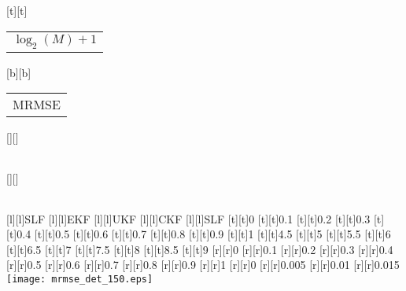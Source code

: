 %    
%
%
\begin{psfrags}%
\psfragscanon%
%
[t][t]{\color[rgb]{0,0,0}\setlength{\tabcolsep}{0pt}\begin{tabular}{c}$\log_2 (M) + 1$\end{tabular}}%
[b][b]{\color[rgb]{0,0,0}\setlength{\tabcolsep}{0pt}\begin{tabular}{c}MRMSE\end{tabular}}%
[][]{\color[rgb]{0,0,0}\setlength{\tabcolsep}{0pt}\begin{tabular}{c} \end{tabular}}%
[][]{\color[rgb]{0,0,0}\setlength{\tabcolsep}{0pt}\begin{tabular}{c} \end{tabular}}%
[l][l]{\color[rgb]{0,0,0}SLF}%
[l][l]{\color[rgb]{0,0,0}EKF}%
[l][l]{\color[rgb]{0,0,0}UKF}%
[l][l]{\color[rgb]{0,0,0}CKF}%
[l][l]{\color[rgb]{0,0,0}SLF}%
%
[t][t]{0}%
[t][t]{0.1}%
[t][t]{0.2}%
[t][t]{0.3}%
[t][t]{0.4}%
[t][t]{0.5}%
[t][t]{0.6}%
[t][t]{0.7}%
[t][t]{0.8}%
[t][t]{0.9}%
[t][t]{1}%
[t][t]{4.5}%
[t][t]{5}%
[t][t]{5.5}%
[t][t]{6}%
[t][t]{6.5}%
[t][t]{7}%
[t][t]{7.5}%
[t][t]{8}%
[t][t]{8.5}%
[t][t]{9}%
%
[r][r]{0}%
[r][r]{0.1}%
[r][r]{0.2}%
[r][r]{0.3}%
[r][r]{0.4}%
[r][r]{0.5}%
[r][r]{0.6}%
[r][r]{0.7}%
[r][r]{0.8}%
[r][r]{0.9}%
[r][r]{1}%
[r][r]{0}%
[r][r]{0.005}%
[r][r]{0.01}%
[r][r]{0.015}%
%
\texttt{[image: mrmse\_det\_150.eps]}%
\end{psfrags}%
%
